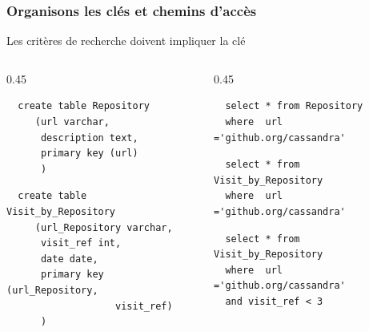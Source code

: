 \begin{frame}[fragile] \frametitle{Organisons les clés et chemins d'accès}

Les critères de recherche doivent impliquer la clé

\vfill
\begin{columns}
    \begin{column}{0.45\textwidth}
  \begin{verbatim}
  create table Repository 
     (url varchar, 
      description text,
      primary key (url)
      )
  \end{verbatim}
  
  \begin{verbatim}
  create table Visit_by_Repository
     (url_Repository varchar,
      visit_ref int,
      date date,
      primary key (url_Repository, 
                   visit_ref)
      )
  \end{verbatim}
  \end{column}
 \begin{column}{0.45\textwidth}

  \begin{verbatim}
  select * from Repository 
  where  url ='github.org/cassandra'
  \end{verbatim}
  
  \vfill
    \begin{verbatim}
  select * from Visit_by_Repository 
  where  url ='github.org/cassandra'
  \end{verbatim}
    \vfill
   
  \begin{verbatim}
  select * from Visit_by_Repository 
  where  url ='github.org/cassandra'
  and visit_ref < 3
  \end{verbatim}
    
\end{column}
\end{columns}

\end{frame}

